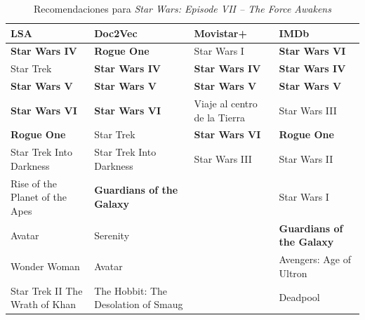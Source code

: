 \documentclass[withindex, glossary]{cam-thesis}
\begin{document}
\begin{table}
    \begin{tabularx}{\textwidth}{XXXX}
        \toprule
        \hiderowcolors{}LSA & Doc2Vec & Movistar+ & IMDb\\
        \midrule
        \showrowcolors{}\textbf{Star Wars IV} & \textbf{Rogue One} & Star Wars I & \textbf{Star Wars VI}\\
        Star Trek & \textbf{Star Wars IV} & \textbf{Star Wars IV} & \textbf{Star Wars IV}\\
        \textbf{Star Wars V} & \textbf{Star Wars V} & \textbf{Star Wars V} & \textbf{Star Wars V}\\
        \textbf{Star Wars VI} & \textbf{Star Wars VI} & Viaje al centro de la Tierra & Star Wars III\\
        \textbf{Rogue One} & Star Trek & \textbf{Star Wars VI} & \textbf{Rogue One}\\
        Star Trek Into Darkness & Star Trek Into Darkness & Star Wars III & Star Wars II\\
        Rise of the Planet of the Apes & \textbf{Guardians of the Galaxy} & & Star Wars I\\
        Avatar & Serenity & & \textbf{Guardians of the Galaxy} \\
        Wonder Woman & Avatar & & Avengers: Age of Ultron\\
        Star Trek II\: The Wrath of Khan & The Hobbit: The Desolation of Smaug & & Deadpool\\
        \bottomrule
    \end{tabularx}
    \caption{Recomendaciones para \textit{Star Wars: Episode VII – The Force Awakens}}
\end{table}
\end{document}
